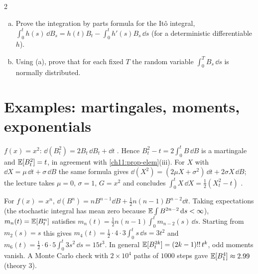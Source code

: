 \begin{paracol}{2}
\begin{exercise}\label{ch17:ex-b3}
\leavevmode
\begin{enumerate}[(a)]
  \item Prove the integration by parts formula for the It\^o integral, $\int_0^th(s)\,\dd B_s=h(t)B_t-\int_0^th'(s)B_s\,\dd s$ (for a deterministic differentiable $h$).
  \item Using (a), prove that for each fixed $T$ the random variable $\int_0^TB_s\,\dd s$ is normally distributed.
\end{enumerate}
\end{exercise}

\section{Examples: martingales, moments, exponentials}\label{ch17:sec-examples}

\begin{example}\label{ch17:ex-square}
$f(x)=x^2$: $\dd(B_t^2)=2B_t\,\dd B_t+\dd t$ . Hence $B_t^2-t=2\int_0^tB\,\dd B$ is a martingale and $\mathbb{E}[B_t^2]=t$, in
agreement with \cref{ch11:prop-elem}(iii). For $X$ with $\dd X=\mu\,\dd t+\sigma\,\dd B$ the same formula gives $\dd(X^2)=(2\mu X+\sigma^2)\,\dd t+2\sigma X\,\dd B$; the lecture takes $\mu=0$, $\sigma=1$, $G=x^2$ and
concludes $\int_0^tX\,\dd X=\tfrac12(X_t^2-t)$ .
\end{example}

\begin{example}\label{ch17:ex-moments}
For $f(x)=x^n$, $\dd(B^n)=nB^{n-1}\dd B+\tfrac12n(n-1)B^{n-2}\dd t$. Taking expectations (the stochastic integral has mean zero because $\mathbb{E}\int B^{2n-2}\,\mathrm{d} s<\infty$),
$m_n(t)=\mathbb{E}[B_t^n]$ satisfies $m_n(t)=\tfrac12n(n-1)\int_0^tm_{n-2}(s)\,\dd s$. Starting from $m_2(s)=s$ this gives $m_4(t)=\tfrac12\cdot4\cdot3\int_0^ts\,\dd s=3t^2$ and $m_6(t)=\tfrac12\cdot6\cdot5\int_0^t3s^2\,\dd s=15t^3$. In general $\mathbb{E}[B_t^{2k}]=(2k-1)!!\,t^k$,
odd moments vanish. A Monte Carlo check with $2\times10^4$ paths of $1000$ steps gave $\mathbb{E}[B_1^4]\approx2.99$ (theory $3$).
\end{example}


\end{paracol}
